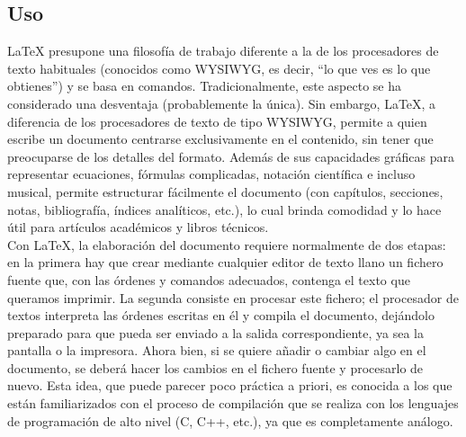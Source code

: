\documentclass[12pt,a4paper,spanish]{book}
\begin{document}
\subsection{Uso}
\LaTeX{} presupone una filosof\'ia de trabajo diferente a la de los procesadores de texto habituales (conocidos como WYSIWYG, es decir, ``lo que ves es lo que obtienes'') y se basa en comandos. Tradicionalmente, este aspecto se ha considerado una desventaja (probablemente la \'unica). Sin embargo, \LaTeX{}, a diferencia de los procesadores de texto de tipo WYSIWYG, permite a quien escribe un documento centrarse exclusivamente en el contenido, sin tener que preocuparse de los detalles del formato. Adem\'as de sus capacidades gr\'aficas para representar ecuaciones, f\'ormulas complicadas, notaci\'on cient\'ifica e incluso musical, permite estructurar f\'acilmente el documento (con cap\'itulos, secciones, notas, bibliograf\'ia, \'indices anal\'iticos, etc.), lo cual brinda comodidad y lo hace \'util para art\'iculos acad\'emicos y libros t\'ecnicos.\\

Con \LaTeX{}, la elaboraci\'on del documento requiere normalmente de dos etapas: en la primera hay que crear mediante cualquier editor de texto llano un fichero fuente que, con las \'ordenes y comandos adecuados, contenga el texto que queramos imprimir. La segunda consiste en procesar este fichero; el procesador de textos interpreta las \'ordenes escritas en \'el y compila el documento, dej\'andolo preparado para que pueda ser enviado a la salida correspondiente, ya sea la pantalla o la impresora. Ahora bien, si se quiere a\~nadir o cambiar algo en el documento, se deber\'a hacer los cambios en el fichero fuente y procesarlo de nuevo. Esta idea, que puede parecer poco pr\'actica a priori, es conocida a los que est\'an familiarizados con el proceso de compilaci\'on que se realiza con los lenguajes de programaci\'on de alto nivel (C, C++, etc.), ya que es completamente an\'alogo.\\
\end{document}
